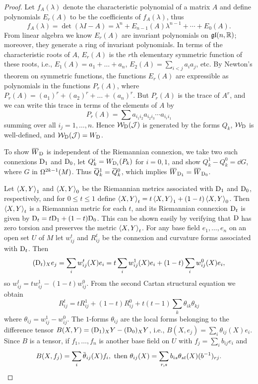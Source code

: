 \documentclass[../main]{subfiles}
\begin{document}
\begin{proof}
Let $f_A(\lambda)$ denote the characteristic polynomial of a matrix $A$ and define polynomials $E_r(A)$ to be the coefficients of $f_A(\lambda)$, thus \[f_A(\lambda)=\det(\lambda I-A)=\lambda^n+E_{n-1}(A)\lambda^{n-1}+\cdots+E_0(A).\] From linear algebra we know $E_r(A)$ are invariant polynomials on $\frakGL(n,\bR)$; moreover, they generate a ring of invariant polynomials. In terms of the characteristic roots of $A$, $E_r(A)$ is the $r$th elementary symmetric function of these roots, i.e., $E_1(A)=a_1+\dots+a_n$, $E_2(A)=\sum_{i<j}a_ia_j$, etc. By Newton's theorem on symmetric functions, the functions $E_r(A)$ are expressible as polynomials in the functions $P_r(A)$, where $P_r(A)=(a_1)^r+(a_2)^r+\dots+(a_n)^r$. But $P_r(A)$ is the trace of $A^r$, and we can write this trace in terms of the elements of $A$ by
\[P_r(A)=\sum a_{i_1 i_2} a_{i_2 i_3} \cdots a_{i_r i_1}\]
summing over all $i_j=1, \dots, n$. Hence ${\cal W}_\connection({\cal J})$ is generated by the forms $Q_k$, ${\cal W}_\connection$ is well-defined, and ${\cal W}_\connection({\cal J})=W_\connection$.

To show $\xoverline{W}_\connection$ is independent of the Riemannian connexion, we take two such connexions $\connection_1$ and $\connection_0$, let $Q_k^i=W_{\connection_i}(P_k)$ for $i=0,1$, and show $Q_k^1-Q_k^0=\dd G$, where $G$ in $\formbundle{M}{2k-1}$. Thus $\xoverline{Q}_k^1=\xoverline{Q}_k^0$, which implies $\xoverline{W}_{\connection_1}=\xoverline{W}_{\connection_0}$.

Let $\ip{X}{Y}_1$ and $\ip{X}{Y}_0$ be the Riemannian metrics associated with $\connection_1$ and $\connection_0$, respectively, and for $0 \leq t \leq 1$ define $\ip{X}{Y}_t=t\ip{X}{Y}_1+(1-t)\ip{X}{Y}_0$. Then $\ip{X}{Y}_t$ is a Riemannian metric for each $t$, and its Riemannian connexion $\connection_t$ is given by $\connection_t=t\connection_1+(1-t)\connection_0$. This can be shown easily by verifying that $\connection$ has zero torsion and preserves the metric $\ip{X}{Y}_t$. For any base field $e_1, \dots, e_n$ on an open set $U$ of $M$ let $w_{i j}^t$ and $R_{i j}^t$ be the connexion and curvature forms associated with $\connection_t$. Then \[(\connection_t)_Xe_j=\sum_i w_{i j}^t(X)e_i=t\sum_iw_{i j}^1(X)e_i+(1-t)\sum_iw_{i j}^0(X)e_i,\] so $w_{i j}^t=t w_{i j}^1-(1-t) w_{i j}^0$. From the second Cartan structural equation we obtain
\[R_{i j}^t=t R_{i j}^1+(1-t) R_{i j}^0+t(t-1)\sum_k\theta_{i k} \theta_{k j}\]
where $\theta_{i j}=w_{i j}^1-w_{ij}^0$. The $1$-forms $\theta_{i j}$ are the local forms belonging to the difference tensor $B(X, Y)=(\connection_1)_X Y-(\connection_0)_X Y$, i.e., $B(X, e_j)=\sum_i\theta_{i j}(X)e_i$. Since $B$ is a tensor, if $f_1, \dots, f_n$ is another base field on $U$ with $f_j=\sum_i b_{i j} e_i$ and \[B(X, f_j)=\sum_i\xoverline{\theta}_{i j}(X)f_i,\text{ then }\theta_{i j}(X)=\sum_{r, s} b_{i s} \theta_{s t}(X)(b^{-1})_{r j}.\]


\end{proof}
\end{document}
